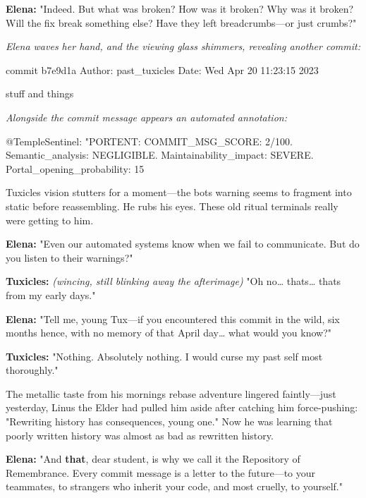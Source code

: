 \textbf{Elena:} "Indeed. But what was broken? How was it broken? Why was it broken? Will the fix break something else? Have they left breadcrumbs---or just crumbs?"

\emph{Elena waves her hand, and the viewing glass shimmers, revealing another commit:}

\begin{codeblock}
commit b7e9d1a
Author: past_tuxicles
Date: Wed Apr 20 11:23:15 2023

stuff and things
\end{codeblock}

\emph{Alongside the commit message appears an automated annotation:}

\begin{codeblock}
@TempleSentinel: "PORTENT: COMMIT_MSG_SCORE: 2/100. Semantic_analysis: NEGLIGIBLE. Maintainability_impact: SEVERE. Portal_opening_probability: 15%
\end{codeblock}

Tuxicles\textquotesingle{} vision stutters for a moment---the bot\textquotesingle s warning seems to fragment into static before reassembling. He rubs his eyes. These old ritual terminals really were getting to him.

\textbf{Elena:} "Even our automated systems know when we fail to communicate. But do you listen to their warnings?"

\textbf{Tuxicles:} \emph{(wincing, still blinking away the afterimage)} "Oh no\ldots{} that\textquotesingle s\ldots{} that\textquotesingle s from my early days."

\textbf{Elena:} "Tell me, young Tux---if you encountered this commit in the wild, six months hence, with no memory of that April day\ldots{} what would you know?"

\textbf{Tuxicles:} "Nothing. Absolutely nothing. I would curse my past self most thoroughly."

The metallic taste from his morning\textquotesingle s rebase adventure lingered faintly---just yesterday, Linus the Elder had pulled him aside after catching him force-pushing: "Rewriting history has consequences, young one." Now he was learning that poorly written history was almost as bad as rewritten history.

\textbf{Elena:} "And \textbf{that}, dear student, is why we call it the Repository of Remembrance. Every commit message is a letter to the future---to your teammates, to strangers who inherit your code, and most cruelly, to yourself."


